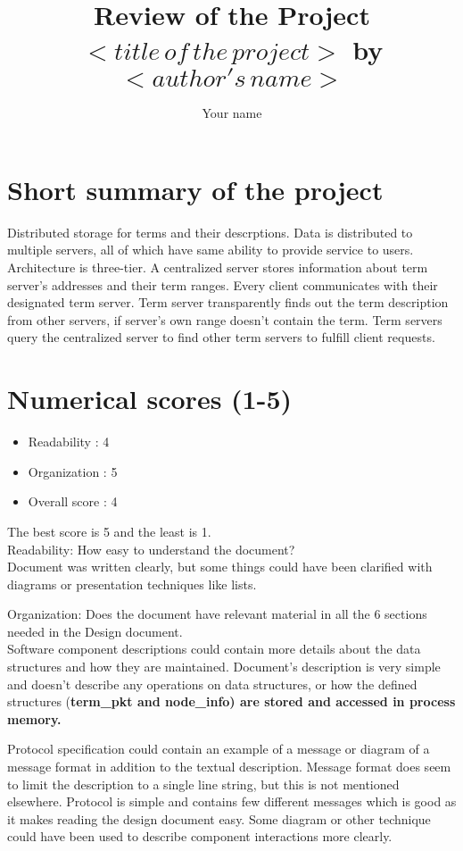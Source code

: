 \documentclass{article}
\begin{document}
\title{Review of the Project $<title\, of\, the \, project>$ by $<author's\,name>$ }
\author{Your name} 
\maketitle
\section{Short summary of the project}
Distributed storage for terms and their descrptions. Data is distributed to multiple servers, all of which have same ability to provide service to users. Architecture is three-tier. A centralized server stores information about term server's addresses and their term ranges.
Every client communicates with their designated term server. Term server transparently finds out the term description from other servers, if server's own range doesn't contain the term.
Term servers query the centralized server to find other term servers to fulfill client requests.
\section{Numerical scores (1-5)}

\begin{itemize}
\item Readability : 4
\item Organization : 5
\item Overall score : 4
\end{itemize}

\noindent The best score is 5 and the least is 1.\\
Readability: How easy to understand the document? \\
Document was written clearly, but some things could have been clarified with diagrams or presentation techniques like lists.

Organization: Does the document have relevant material in all the 6 sections needed in  the Design document.\\
Software component descriptions could contain more details about the data structures and how they are maintained. Document's description is very simple and doesn't describe any operations on data structures, or how the defined structures (\bf{term\_pkt} and \bf{node\_info}) are stored and accessed in process memory.

Protocol specification could contain an example of a message or diagram of a message format in addition to the textual description. Message format does seem to limit the description to a single line string, but this is not mentioned elsewhere. Protocol is simple and contains few different messages which is good as it makes reading the design document easy. Some diagram or other technique could have been used to describe component interactions more clearly.
\end{document}
